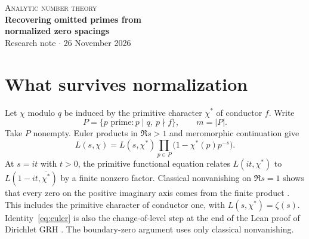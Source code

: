 \documentclass[11pt]{article}
\begin{document}
\thispagestyle{plain}
\begin{center}
{\large\scshape Analytic number theory}\vspace{0.45em}\\
{\LARGE\bfseries Recovering omitted primes from\\[3pt]normalized zero spacings}\vspace{0.65em}\\
{\normalsize Research note $\cdot$ 26 November 2026}
\end{center}
\begin{abstract}
The zeros of an imprimitive Dirichlet $L$-function on the positive imaginary axis
come from Euler factors omitted when its primitive character is induced to a
larger modulus. Take the consecutive gaps between these zeros, divide by their mean,
and retain only the limiting distribution. If at least three primes were omitted,
the distribution determines their identities. In fact its restriction to
arbitrarily short gaps suffices. The proof combines the known spacing law for
a union of incommensurable lattices with the six exponentials theorem. The inverse
is discontinuous. Disjoint sets of arbitrarily large primes can approximate
the same limiting distribution.
\end{abstract}

\section{What survives normalization}
Let $\chi$ modulo $q$ be induced by the primitive character $\chi^*$ of conductor $f$.
Write
\[
 P=\{p\text{ prime}:p\mid q,\ p\nmid f\},\qquad m=|P|.
\]
Take $P$ nonempty. Euler products in $\Re s>1$ and meromorphic continuation give
\begin{equation}\label{eq:euler}
 L(s,\chi)=L(s,\chi^*)\prod_{p\in P}\bigl(1-\chi^*(p)p^{-s}\bigr).
\end{equation}
At $s=it$ with $t>0$, the primitive functional equation relates $L(it,\chi^*)$
to $L(1-it,\overline{\chi^*})$ by a finite nonzero factor. Classical nonvanishing
on $\Re s=1$ shows that every zero on the positive imaginary axis comes from the finite product
\cite{ked,dlmf}. This includes the primitive character of conductor one, with
$L(s,\chi^*)=\zeta(s)$. Identity~\eqref{eq:euler} is also the change-of-level step
at the end of the Lean proof of Dirichlet GRH \cite{lean}. The boundary-zero
argument uses only classical nonvanishing.
\end{document}
